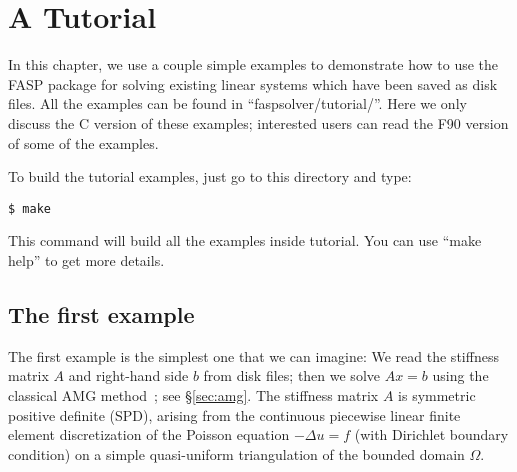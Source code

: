 \documentclass[11pt]{memoir}
\begin{document}
\chapter{A Tutorial}\label{ch:tutor}

In this chapter, we use a couple simple examples to demonstrate how to use the FASP package for solving existing linear systems which have been saved as disk files. All the examples can be found in ``faspsolver/tutorial/''. Here we only discuss the C version of these examples; interested users can read the F90 version of some of the examples.

To build the tutorial examples, just go to this directory and type:
%
\begin{lstlisting}[numbers=none]
$ make
\end{lstlisting}
%
This command will build all the examples inside tutorial. You can use ``make help'' to get more details. 


\section{The first example}\label{sec:ex1}

The first example is the simplest one that we can imagine: We read the stiffness matrix $A$ and right-hand side $b$ from disk files; then we solve $Ax=b$ using the classical AMG method~\cite{Brandt.BrandtMcCormick.1982uq,Ruge.RugeStuben.1985ij,Ruge.RugeStuben.1987bs}; see \S\ref{sec:amg}. The stiffness matrix $A$ is symmetric positive definite (SPD), arising from the continuous piecewise linear finite element discretization of the Poisson equation $-\Delta u = f$ (with Dirichlet boundary condition) on a simple quasi-uniform triangulation of the bounded domain $\Omega$. 
 
\end{document}
